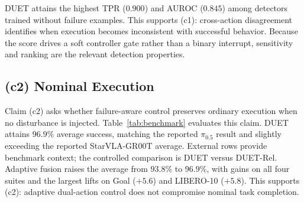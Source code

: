 \documentclass[letterpaper, 10 pt, conference]{ieeeconf}
\begin{document}
\begin{table}[t]
\caption{Failure-detection comparison. TPR, TNR, balanced accuracy (Bal.-Acc.), AUROC, and Loc.@16 are higher-is-better; detection delay is lower-is-better. Bold values indicate the best result in each column.}
\label{tab:detector_baselines}
\centering
{}
\end{table}

DUET attains the highest TPR ($0.900$) and AUROC ($0.845$) among detectors trained without failure examples. This supports (c1): cross-action disagreement identifies when execution becomes inconsistent with successful behavior. Because the score drives a soft controller gate rather than a binary interrupt, sensitivity and ranking are the relevant detection properties.


\subsection{(c2) Nominal Execution}
Claim (c2) asks whether failure-aware control preserves ordinary execution when no disturbance is injected. Table~\ref{tab:benchmark} evaluates this claim. DUET attains $96.9\%$ average success, matching the reported $\pi_{0.5}$ result and slightly exceeding the reported StarVLA-GR00T average. External rows provide benchmark context; the controlled comparison is DUET versus DUET-Rel. Adaptive fusion raises the average from $93.8\%$ to $96.9\%$, with gains on all four suites and the largest lifts on Goal ($+5.6$) and LIBERO-10 ($+5.8$). This supports (c2): adaptive dual-action control does not compromise nominal task completion.
\end{document}
